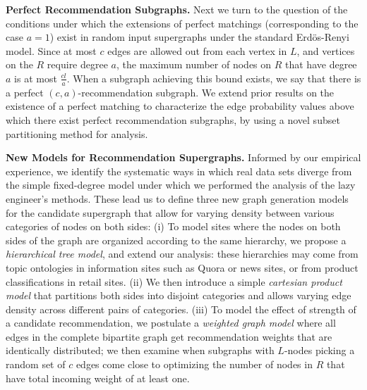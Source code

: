 \noindent
{\bf Perfect Recommendation Subgraphs.} Next we turn to the question
of the conditions under which the extensions of perfect matchings
(corresponding to the case $a=1$) exist in random input
supergraphs under the standard Erd\"os-Renyi model. Since at most $c$
edges are allowed out from each vertex in $L$, and vertices on the
$R$ require degree $a$, the maximum number of nodes on $R$
that have degree $a$ is at most $\frac{cl}{a}$. When a subgraph
achieving this bound exists, we say that there is a perfect
$(c,a)$-recommendation subgraph. We extend prior results on the
existence of a perfect matching to characterize the edge
probability values above which there exist perfect recommendation
subgraphs, by using a novel subset partitioning method for
analysis. \vs


\noindent
{\bf New Models for Recommendation Supergraphs.}
Informed by our empirical experience, we identify the systematic ways in which real data sets diverge from the simple fixed-degree model under which we performed the analysis of the lazy engineer's methods. These lead us to define three new graph generation models for the candidate supergraph that allow for varying density between various categories of nodes on both sides: (i) To model sites where the nodes on both sides of the graph are organized according to the same hierarchy,
we propose a {\em hierarchical tree model}, and extend our analysis: these hierarchies may come from topic ontologies in information sites such as Quora or news sites, or from product classifications in retail sites.
(ii) We then introduce a simple {\em cartesian product model} that partitions both sides into disjoint categories
and allows varying edge density across different pairs of
categories. (iii) To model the effect of strength of a candidate recommendation, we postulate a {\em weighted graph model} where all edges in the complete bipartite graph get recommendation weights that are identically distributed; we then examine when subgraphs with $L$-nodes picking a random set of $c$ edges come close to optimizing the number of nodes in $R$ that have total incoming weight of at least one. \vs

